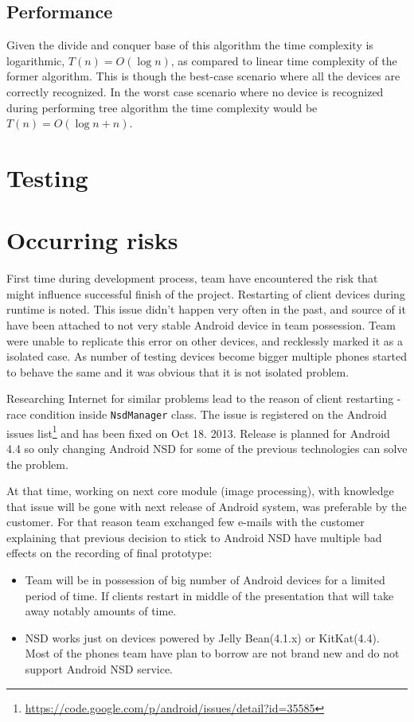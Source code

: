 \subsection{Performance}
Given the divide and conquer base of this algorithm the time complexity is logarithmic, $T(n) = O(\log n)$, as compared to linear time complexity of the former algorithm. This is though the best-case scenario where all the devices are correctly recognized. In the worst case scenario where no device is recognized during performing tree algorithm the time complexity would be $T(n) = O(\log n + n)$.



\section{Testing}
\section{Occurring risks}
\label{sec:sprint5_occuring_risks}
First time during development process, team have encountered the risk that might influence successful finish of the project. 
Restarting of client devices during runtime is noted. This issue didn't happen very often in the past, and source of it have been attached to not very stable Android device in team possession. Team were unable to replicate this error on other devices, and recklessly marked it as a isolated case. As number of testing devices become bigger multiple phones started to behave the same and it was obvious that it is not isolated problem. 

Researching Internet for similar problems lead to the
reason of client restarting - race condition inside \texttt{NsdManager} class. The issue is registered on the Android issues list\footnote{\url{https://code.google.com/p/android/issues/detail?id=35585}} and has been fixed on Oct 18. 2013. Release is planned for Android 4.4 so only changing Android NSD for some of the previous technologies can solve the problem. 

At that time, working on next core module (image processing), with knowledge that issue will be gone with next release of Android system, was preferable by the customer. For that reason team exchanged few e-mails with the customer explaining that previous decision to stick to Android NSD have multiple bad effects on the recording of final prototype:
\begin{itemize}
\item Team will be in possession of big number of Android devices for a limited period of time. If clients restart in middle of the presentation that will take away notably amounts of time.

\item NSD works just on devices powered by Jelly Bean(4.1.x) or KitKat(4.4). Most of the phones team have plan to borrow are not brand new and do not support Android NSD service.
\end{itemize}

